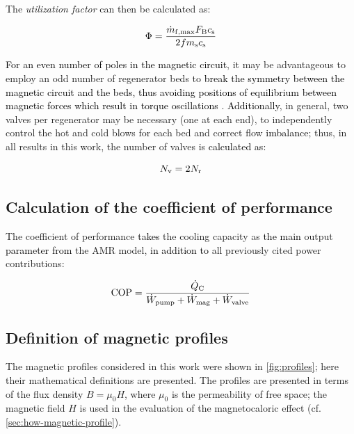 \documentclass[referee]{svjour3}
\begin{document}
The \emph{utilization factor} can then be calculated as:

\begin{equation}
  \label{eq:110}
  \Phi = \frac{\dot{m}_{\mathrm{f,max}} F_{\mathrm{B}} c_{\mathrm{s}}}{2 f m_{\mathrm{s}} c_{\mathrm{s}}}
\end{equation}


\textcolor{black}{For an even number of poles in the magnetic circuit}, it may be advantageous to employ an odd number of regenerator beds to  \textcolor{black}{break the symmetry between the magnetic circuit and the beds, thus avoiding positions of equilibrium between magnetic forces which result in torque oscillations} \cite{bib:eriksen}. \textcolor{black}{Additionally}, in general, two valves per regenerator  may be necessary (one at each end), to independently control  the hot and cold blows for each bed and correct flow \textcolor{black}{imbalance}; thus, in all results in this work, the number of valves is \textcolor{black}{calculated as}:

\begin{equation}
  \label{eq:111}
  N_{\mathrm{v}} = 2 N_{\mathrm{r}}
\end{equation}

\subsection{Calculation of the coefficient of performance}
\label{sec:calc-coeff-perf}

The coefficient of performance \textcolor{black}{takes} the cooling capacity as \textcolor{black}{the main} output \textcolor{black}{parameter from} the AMR model, \textcolor{black}{in addition to} all previously cited power contributions:

\begin{equation}
  \label{eq:112}
  \mathrm{COP} = \frac{\dot{Q}_{\mathrm{C}}}{\dot{W}_{\mathrm{pump}} + \dot{W}_{\mathrm{mag}} + \dot{W}_{\mathrm{valve}}}
\end{equation}

\subsection{Definition of magnetic profiles}
\label{sec:defin-magn-prof}

The magnetic profiles considered in this work were shown in \autoref{fig:profiles}; here their mathematical definitions are presented. The profiles are presented in terms of the flux density $B = \mu_0 H$, where $\mu_0$ is the permeability of free space; the magnetic field $H$ is used in the evaluation of the magnetocaloric effect (cf. \autoref{sec:how-magnetic-profile}).
\end{document}
